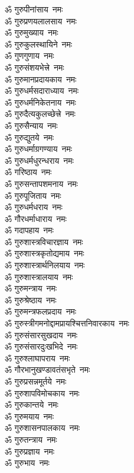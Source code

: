 \begin{multicols}{2}
\begin{flushleft}
ॐ गुरुपीनांसाय~नमः\hfill{}\\
ॐ गुरुप्रणयलालसाय~नमः\\
ॐ गुरुमुख्याय~नमः\\
ॐ गुरुकुलस्थायिने~नमः\\
ॐ गुणगुणाय~नमः\\
ॐ गुरुसंशयभेत्त्रे~नमः\\
ॐ गुरुमानप्रदायकाय~नमः\\
ॐ गुरुधर्मसदाराध्याय~नमः\\
ॐ गुरुधर्मनिकेतनाय~नमः\\
ॐ गुरुदैत्यकुलच्छेत्त्रे~नमः\\
ॐ गुरुसैन्याय~नमः\hfill{}\\
ॐ गुरुद्युतये~नमः\\
ॐ गुरुधर्माग्रगण्याय~नमः\\
ॐ गुरुधर्मधुरन्धराय~नमः\\
ॐ गरिष्ठाय~नमः\\
ॐ गुरुसन्तापशमनाय~नमः\\
ॐ गुरुपूजिताय~नमः\\
ॐ गुरुधर्मधराय~नमः\\
ॐ गौरधर्माधाराय~नमः\\
ॐ गदापहाय~नमः\\
ॐ गुरुशास्त्रविचारज्ञाय~नमः\hfill{}\\
ॐ गुरुशास्त्रकृतोद्यमाय~नमः\\
ॐ गुरुशास्त्रार्थनिलयाय~नमः\\
ॐ गुरुशास्त्रालयाय~नमः\\
ॐ गुरुमन्त्राय~नमः\\
ॐ गुरुश्रेष्ठाय~नमः\\
ॐ गुरुमन्त्रफलप्रदाय~नमः\\
ॐ गुरुस्त्रीगमनोद्दाम\-प्रायश्चित्तनिवारकाय~नमः\\
ॐ गुरुसंसारसुखदाय~नमः\\
ॐ गुरुसंसारदुःखभिदे~नमः\\
ॐ गुरुश्लाघापराय~नमः\hfill{}\\
ॐ गौरभानुखण्डावतंसभृते~नमः\\
ॐ गुरुप्रसन्नमूर्तये~नमः\\
ॐ गुरुशापविमोचकाय~नमः\\
ॐ गुरुकान्तये~नमः\\
ॐ गुरुमयाय~नमः\\
ॐ गुरुशासनपालकाय~नमः\\
ॐ गुरुतन्त्राय~नमः\\
ॐ गुरुप्रज्ञाय~नमः\\
ॐ गुरुभाय~नमः\\

\end{flushleft}
\end{multicols}
